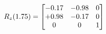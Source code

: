 \documentclass[preview]{standalone}
\begin{document}
\begin{align*}
\special{dvisvgm:raw <g id='unique000'>}R_{z}(1.75) = \begin{bmatrix}-0.17 & -0.98 & 0 \\+0.98 & -0.17 & 0 \\0 & 0 & 1\end{bmatrix}\special{dvisvgm:raw </g>}
\end{align*}
\end{document}

